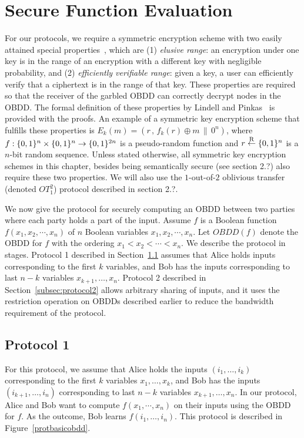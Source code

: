 \section{Secure Function Evaluation}
\label{sec:sfe-obdd}


For our protocols, we require a symmetric encryption scheme with two
easily attained special properties~\cite{LP04}, which are {\sf (1)} {\it elusive
range}: an encryption under one key is in the range of an encryption
with a different key with negligible probability, and {\sf (2)} {\it efficiently
verifiable range}: given a key, a user can efficiently verify that a
ciphertext is in the range of that key. These properties are required
so that the receiver of the garbled OBDD can correctly decrypt
nodes in the OBDD. The formal definition of these properties by
Lindell and Pinkas~\cite{LP04} is provided with the proofs. An example
of a symmetric key encryption scheme that fulfills these properties is
$E_k(m)=(r\,,\,f_k(r)\oplus m\,\|\,0^n)$, where
$f:\{0,1\}^n\times\{0,1\}^n\rightarrow\{0,1\}^{2n}$ is a pseudo-random
function and $r\stackrel{\mathrm{R}}{\gets}\{0,1\}^n$ is a $n$-bit random sequence. Unless
stated otherwise, all symmetric key encryption schemes in this chapter,
besides being semantically secure (see section 2.?)
also require these two properties.  We will also use the $1$-out-of-$2$
oblivious transfer (denoted $OT^2_1$) protocol described in section 2.?.

We now give the protocol for securely computing an OBDD between two
parties where each party holds a part of the input. Assume $f$ is a
Boolean function $f(x_1,x_2,\cdots,x_n)$ of $n$ Boolean variables
$x_1,x_2,\cdots,x_n$. Let $OBDD(f)$ denote the OBDD for $f$ with the
ordering $x_1 < x_2 < \cdots < x_n$. We describe the protocol in stages.
Protocol 1 described in Section~\ref{sec:obdd-basicprotocol} assumes that
Alice holds inputs corresponding to the first $k$ variables, and 
Bob has the inputs corresponding to last $n-k$ variables
$x_{k+1},\ldots,x_n$. Protocol 2 described in Section~\ref{subsec:protocol2}
allows arbitrary sharing of inputs, and it uses the restriction
operation on OBDDs described earlier to reduce the bandwidth requirement
of the protocol.

\subsection{Protocol 1}
\label{sec:obdd-basicprotocol}


For this protocol, we assume that Alice holds the inputs
$(i_1,\ldots,i_k)$ corresponding to the first $k$ variables
$x_1,\ldots,x_k$, and Bob has the inputs $(i_{k+1},\ldots,i_n)$
corresponding to last $n-k$ variables $x_{k+1},\ldots,x_n$. In our
protocol, Alice and Bob want to compute $f(x_1,\cdots,x_n)$ on
their inputs using the OBDD for $f$. As the outcome, Bob learns
$f(i_1,\ldots,i_n)$.  This protocol is described in
Figure~\ref{protbasicobdd}.


